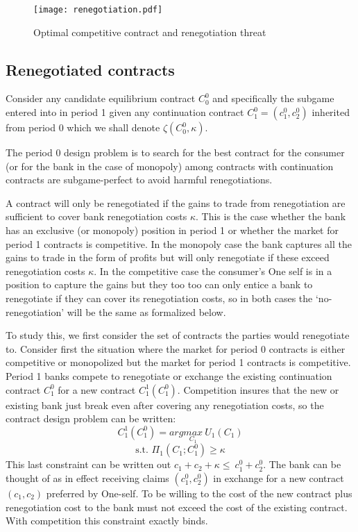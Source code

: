 \documentclass[11pt,english]{article}
\theoremstyle{plain}
\theoremstyle{definition}
\begin{document}
\begin{figure}
\texttt{[image: renegotiation.pdf]}
\caption[Full-commitment and renegotiation-proof contracts under competition]{Optimal competitive contract and renegotiation threat }

\label{fig:c1c2} 
\end{figure}

\subsection{Renegotiated contracts}

Consider any candidate equilibrium contract \(C_{0}^{0}\) and specifically the subgame entered into in period 1 given any continuation
contract $C_{1}^{0}=(c_{1}^{0},c_{2}^{0})$ inherited from period
0 which we shall denote $\zeta(C_{0}^{0},\kappa)$. 

The period 0 design problem is to search for the best contract for the consumer (or for the bank in the case of monopoly) among contracts with continuation
contracts are subgame-perfect to avoid harmful renegotiations.

A contract will only be renegotiated if the gains to trade from renegotiation are sufficient to cover bank renegotiation costs $\kappa $. This is the case whether the bank has an exclusive (or monopoly) position in period 1 or whether the market for period 1 contracts is competitive.  In the monopoly case the bank captures all the gains to trade in the form of profits but will only renegotiate if these exceed renegotiation costs $\kappa$.  In the competitive case the consumer's One self is in a position to capture the gains but they too too can only entice a bank to renegotiate if they can cover its renegotiation costs, so in both cases the `no-renegotiation' will be the same as formalized below. 

To study this, we first consider the set of contracts the parties would renegotiate to.  Consider first the situation where the market for period 0 contracts is either competitive or
monopolized but the market for period 1 contracts
is competitive.  
Period 1 banks compete to renegotiate
or exchange the existing continuation contract $C_{1}^{0}$ for a new contract
$C_{1}^{1}(C_{1}^{0})$. Competition insures that the new or existing bank just
break even after covering any renegotiation costs, so the contract design problem can be written: 
\begin{equation}
C_{1}^{1}(C_{1}^{0})=arg\underset{C_{1}}{max}\ U_{1}(C_{1})
\end{equation}
\begin{equation}
\text{s.t. }\Pi_{1}(C_{1};C_{1}^{0})\ge\kappa\label{eq:PiGain}
\end{equation}
This last constraint can be written out \(c_1+c_2+\kappa \le\ c_1^0+c_2^0 \). The bank can be thought of as in effect receiving claims $(c_1^0,c_2^0)$ in exchange for a new contract $(c_1,c_2)$ preferred by One-self. To be willing to the cost of the new contract plus renegotiation cost to the bank must not exceed the cost of the existing contract.
 With competition this constraint exactly binds.
 
\end{document}
